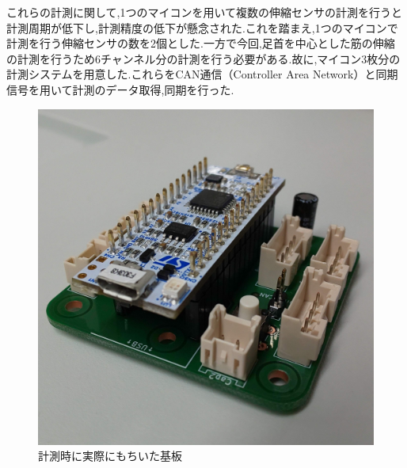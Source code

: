 これらの計測に関して,1つのマイコンを用いて複数の伸縮センサの計測を行うと計測周期が低下し,計測精度の低下が懸念された.これを踏まえ,1つのマイコンで計測を行う伸縮センサの数を2個とした.一方で今回,足首を中心とした筋の伸縮の計測を行うため6チャンネル分の計測を行う必要がある.故に,マイコン3枚分の計測システムを用意した.これらをCAN通信（Controller Area Network）と同期信号を用いて計測のデータ取得,同期を行った.
\begin{figure}[h]
 \begin{center}
  \includegraphics[width=0.75\columnwidth,clip]{Photo/BackGround/circuit.eps}
  \caption{計測時に実際にもちいた基板}
  \label{circuit}
 \end{center}
\end{figure}